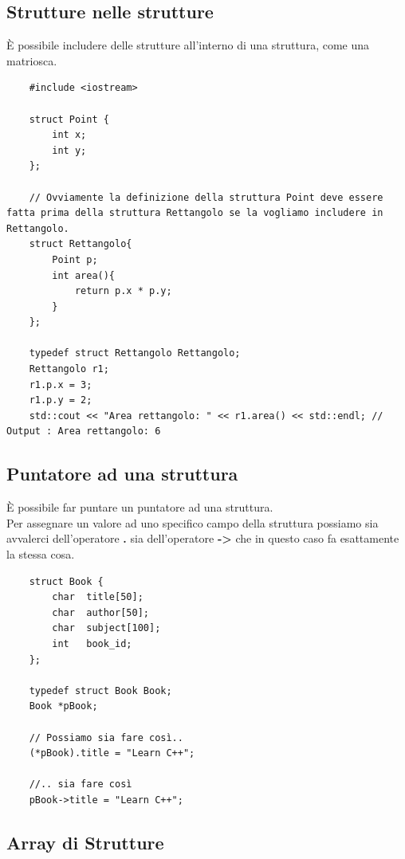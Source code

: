 \subsection{Strutture nelle strutture}

\textsf{\small È possibile includere delle strutture all'interno di una struttura, come una matriosca.} \\

\begin{lstlisting}
	#include <iostream>
	
	struct Point {
		int x;
		int y;
	};

	// Ovviamente la definizione della struttura Point deve essere fatta prima della struttura Rettangolo se la vogliamo includere in Rettangolo.
	struct Rettangolo{
		Point p;
		int area(){
			return p.x * p.y;
		}
	};

	typedef struct Rettangolo Rettangolo;
	Rettangolo r1;
	r1.p.x = 3;
	r1.p.y = 2;
	std::cout << "Area rettangolo: " << r1.area() << std::endl; // Output : Area rettangolo: 6
\end{lstlisting}

\subsection{Puntatore ad una struttura}

\textsf{\small È possibile far puntare un puntatore ad una struttura.} \\

\textsf{\small Per assegnare un valore ad uno specifico campo della struttura possiamo sia avvalerci dell'operatore \textbf{.} sia dell'operatore \textbf{->} che in questo caso fa esattamente la stessa cosa.} \\

\begin{lstlisting}
	struct Book {
		char  title[50];
		char  author[50];
		char  subject[100];
		int   book_id;
	};

	typedef struct Book Book;
	Book *pBook;
	
	// Possiamo sia fare così..
	(*pBook).title = "Learn C++";
	
	//.. sia fare così
	pBook->title = "Learn C++";
\end{lstlisting}

\subsection{Array di Strutture}

